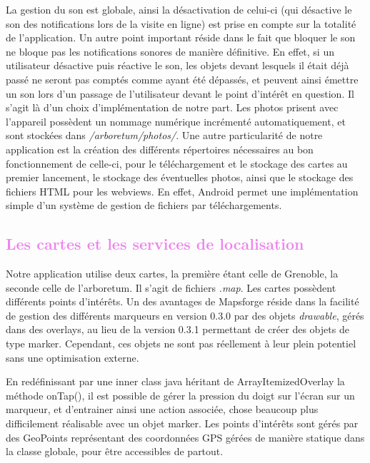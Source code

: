 \documentclass[a4paper,11pt]{article}
\begin{document}
		La gestion du son est globale, ainsi la désactivation de celui-ci (qui désactive le son des notifications lors de la visite en ligne) est prise en compte sur la totalité de l'application. 
		Un autre point important réside dans le fait que bloquer le son ne bloque pas les notifications sonores de manière définitive. En effet, si un utilisateur désactive puis réactive le son, 
		les objets devant lesquels il était déjà passé ne seront pas comptés comme ayant été dépassés, et peuvent ainsi émettre un son lors d'un passage de l'utilisateur devant le point d’intérêt en question. 
		Il s'agit là d'un choix d'implémentation de notre part.
		Les photos prisent avec l'appareil possèdent un nommage numérique incrémenté automatiquement, et sont stockées dans \emph{/arboretum/photos/}. 
		Une autre particularité de notre application est la création des différents répertoires nécessaires au bon fonctionnement de 
		celle-ci, pour le téléchargement et le stockage des cartes au premier lancement, le stockage des éventuelles photos, ainsi que le stockage des fichiers HTML pour les webviews.
		En effet, Android permet une implémentation simple d'un système de gestion de fichiers par téléchargements. %
		
		\textcolor{Violet}{\section{Les cartes et les services de localisation}}
		  
		Notre application utilise deux cartes, la première étant celle de Grenoble, la seconde celle de l'arboretum. Il s'agit de fichiers \emph{.map}. 
		Les cartes possèdent différents points d'intérêts. Un des avantages de Mapsforge réside dans la facilité de gestion des différents marqueurs en version 0.3.0 par des objets \emph{drawable}, gérés dans des overlays, au lieu de la version 0.3.1 permettant de créer des objets de type marker. 
		Cependant, ces objets ne sont pas réellement à leur plein potentiel sans une optimisation externe. 
		
		En redéfinissant par une inner class java héritant de ArrayItemizedOverlay la méthode onTap(), 
		il est possible de gérer la pression du doigt sur l'écran sur un marqueur, et d'entrainer ainsi une action associée, 
		chose beaucoup plus difficilement réalisable avec un objet marker. 
		Les points d'intérêts sont gérés par des GeoPoints représentant des coordonnées GPS gérées de manière statique dans la classe globale, pour être accessibles de partout.
		
\end{document}
